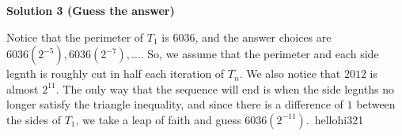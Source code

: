 \begin{enumerate}
 



\textbf{Solution 3 (Guess the answer)}

Notice that the perimeter of $T_1$ is $6036$, and the answer choices are $6036(2^{-5}), 6036(2^{-7}), \dots$. So, we assume that the perimeter and each side legnth is roughly cut in half each iteration of $T_n$. We also notice that $2012$ is almost $2^{11}$. The only way that the sequence will end is when the side legnths no longer satisfy the triangle inequality, and since there is a difference of $1$ between the sides of $T_1$, we take a leap of faith and guess $6036(2^{-11})$.~hellohi321

 


\end{enumerate}